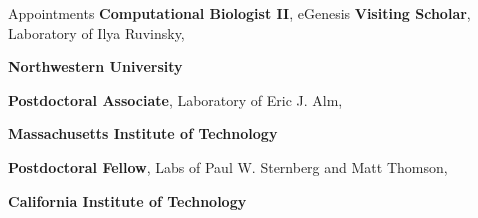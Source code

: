 \begin{rubric}{Appointments}
\entry*[11/2019 -]
	\textbf{Computational Biologist II}, eGenesis
\entry*[7/2020 -]
	\textbf{Visiting Scholar}, Laboratory of Ilya Ruvinsky,
	\par \textbf{Northwestern University}

\entry*[01/2019--11/2019]
		\textbf{Postdoctoral Associate}, Laboratory of Eric J. Alm,
		\par \textbf{Massachusetts Institute of Technology}

\entry*[11/2018--01/2019]
		\textbf{Postdoctoral Fellow}, Labs of Paul W. Sternberg and Matt Thomson,
		\par \textbf{California Institute of Technology}

\end{rubric}
